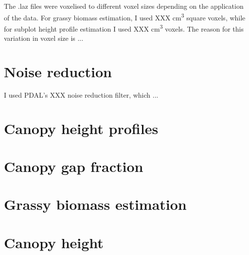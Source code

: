 \documentclass[11pt,a4paper]{article}
\begin{document}
The .laz files were voxelised to different voxel sizes depending on the application of the data. For grassy biomass estimation, I used XXX cm\textsuperscript{3} square voxels, while for subplot height profile estimation I used XXX cm\textsuperscript{3} voxels. The reason for this variation in voxel size is ...

\section{Noise reduction}

I used PDAL's XXX noise reduction filter, which ...

\section{Canopy height profiles}

\section{Canopy gap fraction}

\section{Grassy biomass estimation}

\section{Canopy height}

\printbibliography
\end{document}
